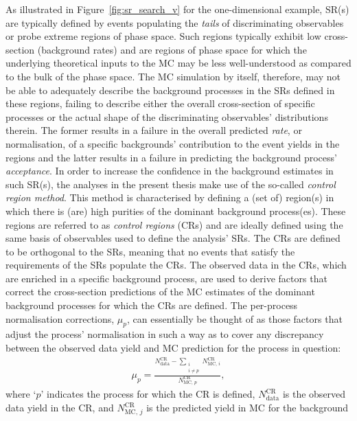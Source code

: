 As illustrated in Figure~\ref{fig:sr_search_v} for the one-dimensional example,
SR(s) are typically defined by events populating the \textit{tails} of discriminating
observables or probe extreme regions of phase space.
Such regions typically exhibit low cross-section (background rates) and
are regions of phase space for which the underlying theoretical inputs
to the MC may be less well-understood as compared to the bulk of the phase space.
The MC simulation by itself, therefore, may not be able to adequately describe the background
processes in the SRs defined in these regions, failing to describe
either the overall cross-section of specific processes or the actual shape of the discriminating observables' distributions
therein.
The former results in a failure in the overall predicted \textit{rate}, or normalisation, of a specific backgrounds' contribution
to the event yields in the regions
and the latter results in a failure in predicting the background process' \textit{acceptance}.
In order to increase the confidence in the background estimates in such SR(s), the analyses in the present
thesis make use of the so-called \textit{control region method}.
This method is characterised by defining a (set of) region(s) in which there is (are) high purities
of the dominant background process(es).
These regions are referred to as \textit{control regions} (CRs) and are ideally defined using the
same basis of observables used to define the analysis' SRs.
The CRs are defined to be orthogonal to the SRs, meaning that no events that satisfy the requirements of
the SRs populate the CRs.
The observed data in the CRs, which are enriched in a specific background process, are used to derive
factors that correct the cross-section predictions of the MC estimates of the dominant background processes for
which the CRs are defined.
The per-process normalisation corrections, $\mu_p$, can essentially be thought of as those factors
that adjust the process' normalisation in such a way as to cover any discrepancy between the observed
data yield and MC prediction for the process in question:
\begin{align}
    \mu_{p} = \frac{  N_{\text{data}}^{\text{CR}} - \sum\limits_{\substack{i \\ i\ne p}} N_{\text{MC},\,i}^{\text{CR}}} { N_{\text{MC},\,p}^{\text{CR}}},
    \label{eq:mu_fac}
\end{align}
where `$p$' indicates the process for which the CR is defined, $N_{\text{data}}^{\text{CR}}$ is the observed
data yield in the CR, and $N_{\text{MC},\,j}^{\text{CR}}$ is the predicted yield in MC for the background
